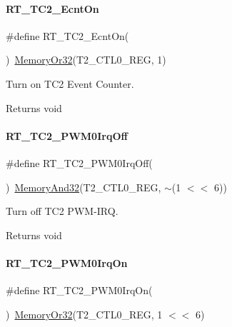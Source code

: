 \paragraph{\texorpdfstring{R\+T\+\_\+\+T\+C2\+\_\+\+Ecnt\+On}{RT\_TC2\_EcntOn}}
{\footnotesize\ttfamily \#define R\+T\+\_\+\+T\+C2\+\_\+\+Ecnt\+On(\begin{DoxyParamCaption}{ }\end{DoxyParamCaption})~\mbox{\hyperlink{a00020_a9ea92ebccdef6bdaca4d00210cc7266d}{Memory\+Or32}}(T2\+\_\+\+C\+T\+L0\+\_\+\+R\+EG, 1)}



Turn on T\+C2 Event Counter. 

\begin{DoxyReturn}{Returns}
void 
\end{DoxyReturn}
\mbox{\label{a00047_aa5878518a5c2f7b419de8ed259b54e75}} 
\paragraph{\texorpdfstring{R\+T\+\_\+\+T\+C2\+\_\+\+P\+W\+M0\+Irq\+Off}{RT\_TC2\_PWM0IrqOff}}
{\footnotesize\ttfamily \#define R\+T\+\_\+\+T\+C2\+\_\+\+P\+W\+M0\+Irq\+Off(\begin{DoxyParamCaption}{ }\end{DoxyParamCaption})~\mbox{\hyperlink{a00020_a5c1a2bd4c1bd4c2f429d8042a45327ff}{Memory\+And32}}(T2\+\_\+\+C\+T\+L0\+\_\+\+R\+EG, $\sim$(1 $<$$<$ 6))}



Turn off T\+C2 P\+W\+M-\/\+I\+RQ. 

\begin{DoxyReturn}{Returns}
void 
\end{DoxyReturn}
\mbox{\label{a00047_a20ca153421087b763d5a1bcec1f90d55}} 
\paragraph{\texorpdfstring{R\+T\+\_\+\+T\+C2\+\_\+\+P\+W\+M0\+Irq\+On}{RT\_TC2\_PWM0IrqOn}}
{\footnotesize\ttfamily \#define R\+T\+\_\+\+T\+C2\+\_\+\+P\+W\+M0\+Irq\+On(\begin{DoxyParamCaption}{ }\end{DoxyParamCaption})~\mbox{\hyperlink{a00020_a9ea92ebccdef6bdaca4d00210cc7266d}{Memory\+Or32}}(T2\+\_\+\+C\+T\+L0\+\_\+\+R\+EG, 1 $<$$<$ 6)}




